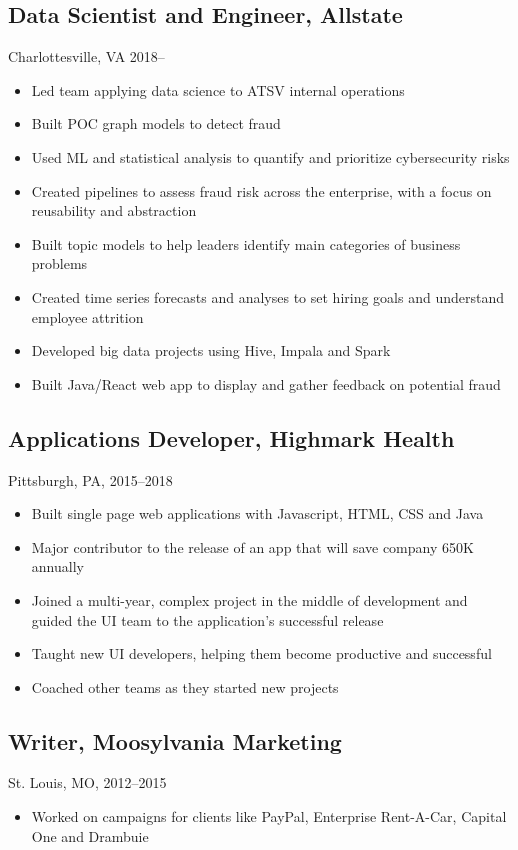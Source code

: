 \documentclass[11pt]{article}
\begin{document}
	\subsection{\normalsize{Data Scientist and Engineer, Allstate}}
	{\fontsize{10pt}{\parskip}\selectfont Charlottesville, VA 2018--}
	\begin{itemize}
  \item Led team applying data science to ATSV internal operations
	\item Built POC graph models to detect fraud
	\item Used ML and statistical analysis to quantify and prioritize cybersecurity risks
	\item Created pipelines to assess fraud risk across the enterprise, with a focus on reusability and abstraction
	\item Built topic models to help leaders identify main categories of business problems
	\item Created time series forecasts and analyses to set hiring goals  \newline and understand employee attrition
	\item Developed big data projects using Hive, Impala and Spark
	\item Built Java/React web app to display and gather feedback on potential fraud
	\end{itemize}

	\subsection{\normalsize{Applications Developer, Highmark Health}}
		{\fontsize{10pt}{\parskip}\selectfont Pittsburgh, PA, 2015--2018}
		\begin{itemize}
		\item Built single page web applications with Javascript, HTML, CSS and Java
		\item Major contributor to the release of an app that will save company 650K annually
		\item Joined a multi-year, complex project in the middle of development and guided the UI team to the application's successful release
		\item Taught new UI developers, helping them become productive and successful
		\item Coached other teams as they started new projects
		\end{itemize}

	\subsection{\normalsize{Writer, Moosylvania Marketing}}
	{\fontsize{10pt}{\parskip}\selectfont St. Louis, MO, 2012--2015}
	\begin{itemize}
		\item Worked on campaigns for clients like PayPal, Enterprise Rent-A-Car, Capital One and Drambuie
	\end{itemize}
\end{document}
